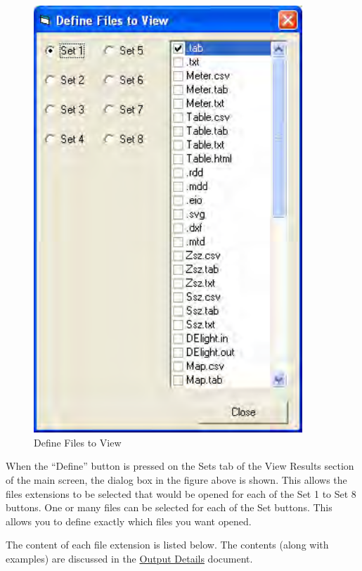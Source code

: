 \begin{figure}[hbtp] %
\centering
\includegraphics[width=0.9\textwidth, height=0.9\textheight, keepaspectratio=true]{media/image104.png}
\caption{Define Files to View \protect \label{fig:define-files-to-view}}
\end{figure}

When the ``Define'' button is pressed on the Sets tab of the View Results section of the main screen, the dialog box in the figure above is shown. This allows the files extensions to be selected that would be opened for each of the Set 1 to Set 8 buttons. One or many files can be selected for each of the Set buttons. This allows you to define exactly which files you want opened.

The content of each file extension is listed below. The contents (along with examples) are discussed in the \href{OutputDetailsAndExamples.pdf}{Output Details} document.

